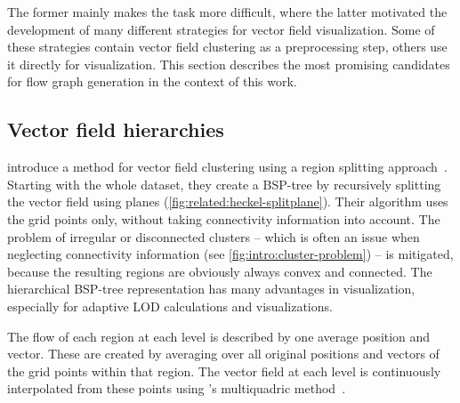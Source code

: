 The former mainly makes the task more difficult, where the latter motivated the development of many different strategies for vector field visualization. Some of these strategies contain vector field clustering as a preprocessing step, others use it directly for visualization. This section describes the most promising candidates for flow graph generation in the context of this work.


\subsection{Vector field hierarchies}

 introduce a method for vector field clustering using a region splitting approach~\cite{Heckel}. Starting with the whole dataset, they create a \ac{BSP}-tree by recursively splitting the vector field using planes (\autoref{fig:related:heckel-splitplane}). Their algorithm uses the grid points only, without taking connectivity information into account.
The problem of irregular or disconnected clusters -- which is often an issue when neglecting connectivity information (see \autoref{fig:intro:cluster-problem}) -- is mitigated, because the resulting regions are obviously always convex and connected. The hierarchical \ac{BSP}-tree representation has many advantages in visualization, especially for adaptive \ac{LOD} calculations and visualizations.
%

The flow of each region at each level is described by one average position and vector. These are created by averaging over all original positions and vectors of the grid points within that region. The vector field at each level is continuously interpolated from these points using 's multiquadric method~\cite{Hardy}.

